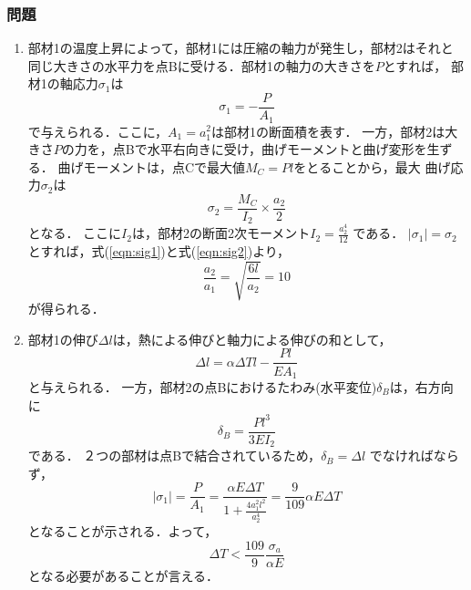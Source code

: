﻿\documentclass[10pt,a4j]{jarticle}
\begin{document}
\subsubsection*{問題}
\begin{enumerate}
\item
	部材1の温度上昇によって，部材1には圧縮の軸力が発生し，部材2はそれと
	同じ大きさの水平力を点Bに受ける．部材1の軸力の大きさを$P$とすれば，
	部材1の軸応力$\sigma_1$は
	\begin{equation}
		\sigma_1=-\frac{P}{A_1}
		\label{eqn:sig1}
	\end{equation}
	で与えられる．ここに，$A_1=a_1^2$は部材1の断面積を表す．
	一方，部材2は大きさ$P$の力を，点Bで水平右向きに受け，曲げモーメントと曲げ変形を生ずる．
	曲げモーメントは，点Cで最大値$M_C=Pl$をとることから，最大
	曲げ応力$\sigma_2$は
	\begin{equation}
		\sigma_2=\frac{M_C}{I_2}\times\frac{a_2}{2}
		\label{eqn:sig2}
	\end{equation}
	となる．
	ここに$I_2$は，部材2の断面2次モーメント$I_2=\frac{a_2^4}{12}$
	である．
		$\left| \sigma_1\right|=\sigma_2$とすれば，式(\ref{eqn:sig1})と式(\ref{eqn:sig2})より，
	\begin{equation}
		\frac{a_2}{a_1}=\sqrt{\frac{6l}{a_2}}=10
	\end{equation}
	が得られる．
\item
	部材1の伸び$\Delta l$は，熱による伸びと軸力による伸びの和として，
	\begin{equation}
		\Delta l= \alpha \Delta T l - \frac{Pl}{EA_1}
		\label{eqn:del_l}
	\end{equation}
	と与えられる．
	一方，部材2の点Bにおけるたわみ(水平変位)$\delta_B$は，右方向に
	\begin{equation}
		\delta_B=\frac{Pl^3}{3EI_2}
		\label{eqn:del_B}
	\end{equation}
	である．
	２つの部材は点Bで結合されているため，$\delta_B=\Delta l$
	でなければならず，
	\begin{equation}
		\left| \sigma_1 \right|
		=
		\frac{P}{A_1}
		=
		\frac{\alpha E\Delta T}{1+\frac{4a_1^2l^2}{a_2^4}}
		=\frac{9}{109}\alpha E \Delta T 
	\end{equation}
	となることが示される．よって，
	\begin{equation}
		\Delta T  < \frac{109}{9}\frac{\sigma_a}{\alpha E}		
	\end{equation}
	となる必要があることが言える．
\end{enumerate}
\end{document}
